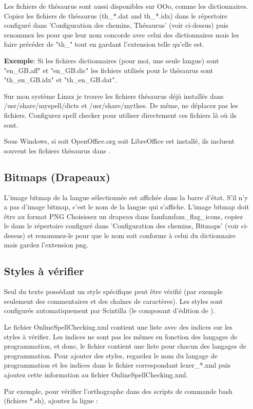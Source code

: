 Les fichiers de thésaurus sont aussi disponibles sur OOo, comme les dictionnaires. Copiez les fichiers de thésaurus (th\_*.dat and th\_*.idx) dans le répertoire configuré dans 'Configuration des chemins, Thésaurus' (voir ci-dessus) puis renommez les pour que leur nom concorde avec celui des dictionnaires mais les faire précéder de "th\_" tout en gardant l'extension telle qu'elle est.

\textbf{Exemple}: Si les fichiers dictionnaires (pour moi, une seule langue) sont "en\_GB.aff" et "en\_GB.dic" les fichiers utilisés pour le thésaurus sont "th\_en\_GB.idx" et "th\_en\_GB.dat".

Sur mon système Linux je trouve les fichiers thésaurus déjà installés dans /usr/share/myspell/dicts et /usr/share/mythes. De même, ne déplacez pas les fichiers. Configurez spell checker pour utiliser directement ces fichiers là où ils sont.

Sous Windows, si soit OpenOffice.org soit LibreOffice est installé, ils incluent souvent les fichiers thésaurus dans . 

\subsection{Bitmaps (Drapeaux)}

L'image bitmap de la langue sélectionnée est affichée dans la barre d'état. S'il n'y a pas d'image bitmap, c'est le nom de la langue qui s'affiche. L'image bitmap doit être au format PNG Choisissez un drapeau dans famfamfam\_flag\_icons, copiez le dans le répertoire configuré dans 'Configuration des chemins, Bitmaps' (voir ci-dessus) et renommez-le pour que le nom soit conforme à celui du dictionnaire mais gardez l'extension png.

\subsection{Styles à vérifier}

Seul du texte possédant un style spécifique peut être vérifié (par exemple seulement des commentaires et des chaînes de caractères). Les styles sont configurés automatiquement par Scintilla (le composant d'édition de \codeblocks).

Le fichier OnlineSpellChecking.xml contient une liste avec des indices sur les styles à vérifier. Les indices ne sont pas les mêmes en fonction des langages de programmation, et donc, le fichier contient une liste pour chacun des langages de programmation. Pour ajouter des styles, regardez le nom du langage de programmation et les indices dans le fichier correspondant lexer\_*.xml puis ajoutez cette information au fichier OnlineSpellChecking.xml.

Par exemple, pour vérifier l'orthographe dans des scripts de commande bash (fichiers *.sh), ajoutez la ligne : 

